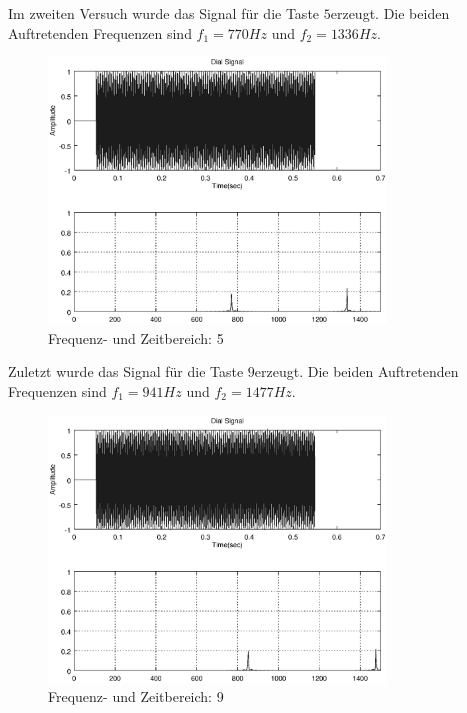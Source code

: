 \documentclass[a4paper]{article}
\begin{document}
Im zweiten Versuch wurde das Signal für die Taste \glqq$5$\grqq erzeugt.
Die beiden Auftretenden Frequenzen sind $f_1=770\si{Hz}$ und $f_2=1336\si{Hz}$.

\begin{figure}[H]
    \centering
    \includegraphics[width=0.8\textwidth, keepaspectratio]{nummer_5_fft_time.eps}
    \caption{Frequenz- und Zeitbereich: 5}
    \label{fig:nummer-5-fft-time}
\end{figure}

Zuletzt wurde das Signal für die Taste \glqq$9$\grqq erzeugt.
Die beiden Auftretenden Frequenzen sind $f_1=941\si{Hz}$ und $f_2=1477\si{Hz}$.

\begin{figure}[H]
    \centering
    \includegraphics[width=0.8\textwidth, keepaspectratio]{nummer_9_fft_time.eps}
    \caption{Frequenz- und Zeitbereich: 9}
    \label{fig:nummer-9-fft-time}
\end{figure}
\end{document}
